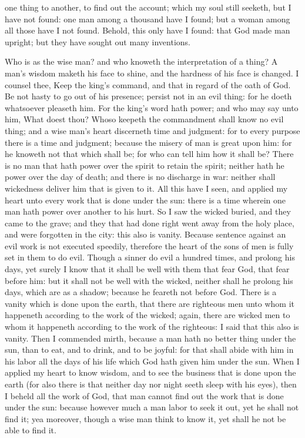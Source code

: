 one thing to another, to find out the account; which my soul still seeketh, but I have not found: one man among a thousand have I found; but a woman among all those have I not found. Behold, this only have I found: that God made man upright; but they have sought out many inventions. 

Who is as the wise man? and who knoweth the interpretation of a thing? A man’s wisdom maketh his face to shine, and the hardness of his face is changed. I counsel thee, Keep the king’s command, and that in regard of the oath of God. Be not hasty to go out of his presence; persist not in an evil thing: for he doeth whatsoever pleaseth him. For the king’s word hath power; and who may say unto him, What doest thou? Whoso keepeth the commandment shall know no evil thing; and a wise man’s heart discerneth time and judgment: for to every purpose there is a time and judgment; because the misery of man is great upon him: for he knoweth not that which shall be; for who can tell him how it shall be? There is no man that hath power over the spirit to retain the spirit; neither hath he power over the day of death; and there is no discharge in war: neither shall wickedness deliver him that is given to it.  All this have I seen, and applied my heart unto every work that is done under the sun: there is a time wherein one man hath power over another to his hurt. So I saw the wicked buried, and they came to the grave; and they that had done right went away from the holy place, and were forgotten in the city: this also is vanity. Because sentence against an evil work is not executed speedily, therefore the heart of the sons of men is fully set in them to do evil. Though a sinner do evil a hundred times, and prolong his days, yet surely I know that it shall be well with them that fear God, that fear before him: but it shall not be well with the wicked, neither shall he prolong his days, which are as a shadow; because he feareth not before God.  There is a vanity which is done upon the earth, that there are righteous men unto whom it happeneth according to the work of the wicked; again, there are wicked men to whom it happeneth according to the work of the righteous: I said that this also is vanity. Then I commended mirth, because a man hath no better thing under the sun, than to eat, and to drink, and to be joyful: for that shall abide with him in his labor all the days of his life which God hath given him under the sun.  When I applied my heart to know wisdom, and to see the business that is done upon the earth (for also there is that neither day nor night seeth sleep with his eyes), then I beheld all the work of God, that man cannot find out the work that is done under the sun: because however much a man labor to seek it out, yet he shall not find it; yea moreover, though a wise man think to know it, yet shall he not be able to find it. 

